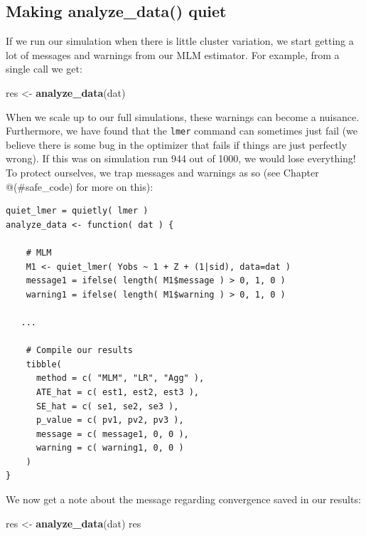 \documentclass[
]{book}
\newenvironment{Shaded}{\begin{snugshade}}{\end{snugshade}}
\newcommand{\FunctionTok}[1]{\textcolor[rgb]{0.13,0.29,0.53}{\textbf{#1}}}
\newcommand{\NormalTok}[1]{#1}
\newcommand{\OtherTok}[1]{\textcolor[rgb]{0.56,0.35,0.01}{#1}}
\begin{document}
\subsection{Making analyze\_data() quiet}\label{making-analyze_data-quiet}

If we run our simulation when there is little cluster variation, we start getting a lot of messages and warnings from our MLM estimator.
For example, from a single call we get:

\begin{Shaded}
\begin{Highlighting}[]
\NormalTok{res }\OtherTok{\textless{}{-}} \FunctionTok{analyze\_data}\NormalTok{(dat)}
\end{Highlighting}
\end{Shaded}

When we scale up to our full simulations, these warnings can become a nuisance.
Furthermore, we have found that the \texttt{lmer} command can sometimes just fail (we believe there is some bug in the optimizer that fails if things are just perfectly wrong).
If this was on simulation run 944 out of 1000, we would lose everything!
To protect ourselves, we trap messages and warnings as so (see Chapter @(\#safe\_code) for more on this):

\begin{verbatim}
quiet_lmer = quietly( lmer )
analyze_data <- function( dat ) {
    
    # MLM
    M1 <- quiet_lmer( Yobs ~ 1 + Z + (1|sid), data=dat )
    message1 = ifelse( length( M1$message ) > 0, 1, 0 )
    warning1 = ifelse( length( M1$warning ) > 0, 1, 0 )

   ...

    # Compile our results
    tibble( 
      method = c( "MLM", "LR", "Agg" ),
      ATE_hat = c( est1, est2, est3 ),
      SE_hat = c( se1, se2, se3 ),
      p_value = c( pv1, pv2, pv3 ),
      message = c( message1, 0, 0 ),
      warning = c( warning1, 0, 0 )
    )
}
\end{verbatim}

We now get a note about the message regarding convergence saved in our results:

\begin{Shaded}
\begin{Highlighting}[]
\NormalTok{res }\OtherTok{\textless{}{-}} \FunctionTok{analyze\_data}\NormalTok{(dat)}
\NormalTok{res}
\end{Highlighting}
\end{Shaded}
\end{document}

